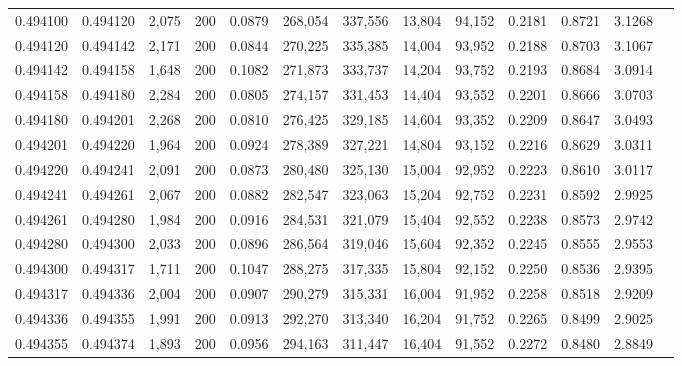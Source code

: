 \begin{tabular}{rrrrrrrrrrrrr}
0.494100 & 0.494120 &  2,075 & 200 &                                     0.0879 & 268,054 & 337,556 &  13,804 &  94,152 & 0.2181 & 0.8721 & 3.1268 \\
0.494120 & 0.494142 &  2,171 & 200 &                                     0.0844 & 270,225 & 335,385 &  14,004 &  93,952 & 0.2188 & 0.8703 & 3.1067 \\
0.494142 & 0.494158 &  1,648 & 200 &                                     0.1082 & 271,873 & 333,737 &  14,204 &  93,752 & 0.2193 & 0.8684 & 3.0914 \\
0.494158 & 0.494180 &  2,284 & 200 &                                     0.0805 & 274,157 & 331,453 &  14,404 &  93,552 & 0.2201 & 0.8666 & 3.0703 \\
0.494180 & 0.494201 &  2,268 & 200 &                                     0.0810 & 276,425 & 329,185 &  14,604 &  93,352 & 0.2209 & 0.8647 & 3.0493 \\
0.494201 & 0.494220 &  1,964 & 200 &                                     0.0924 & 278,389 & 327,221 &  14,804 &  93,152 & 0.2216 & 0.8629 & 3.0311 \\
0.494220 & 0.494241 &  2,091 & 200 &                                     0.0873 & 280,480 & 325,130 &  15,004 &  92,952 & 0.2223 & 0.8610 & 3.0117 \\
0.494241 & 0.494261 &  2,067 & 200 &                                     0.0882 & 282,547 & 323,063 &  15,204 &  92,752 & 0.2231 & 0.8592 & 2.9925 \\
0.494261 & 0.494280 &  1,984 & 200 &                                     0.0916 & 284,531 & 321,079 &  15,404 &  92,552 & 0.2238 & 0.8573 & 2.9742 \\
0.494280 & 0.494300 &  2,033 & 200 &                                     0.0896 & 286,564 & 319,046 &  15,604 &  92,352 & 0.2245 & 0.8555 & 2.9553 \\
0.494300 & 0.494317 &  1,711 & 200 &                                     0.1047 & 288,275 & 317,335 &  15,804 &  92,152 & 0.2250 & 0.8536 & 2.9395 \\
0.494317 & 0.494336 &  2,004 & 200 &                                     0.0907 & 290,279 & 315,331 &  16,004 &  91,952 & 0.2258 & 0.8518 & 2.9209 \\
0.494336 & 0.494355 &  1,991 & 200 &                                     0.0913 & 292,270 & 313,340 &  16,204 &  91,752 & 0.2265 & 0.8499 & 2.9025 \\
0.494355 & 0.494374 &  1,893 & 200 &                                     0.0956 & 294,163 & 311,447 &  16,404 &  91,552 & 0.2272 & 0.8480 & 2.8849 \\

\end{tabular}
